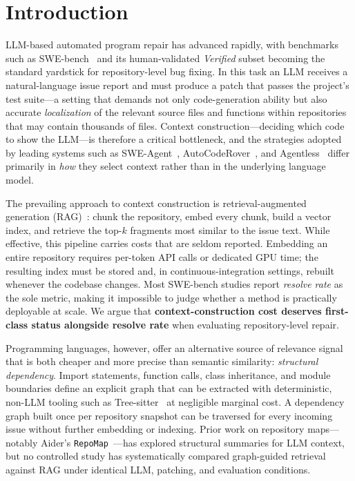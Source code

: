 \section{Introduction}\label{sec:introduction}

LLM-based automated program repair has advanced rapidly, with benchmarks such as SWE-bench~\cite{swebench2024} and its human-validated \emph{Verified} subset becoming the standard yardstick for repository-level bug fixing. In this task an LLM receives a natural-language issue report and must produce a patch that passes the project's test suite---a setting that demands not only code-generation ability but also accurate \emph{localization} of the relevant source files and functions within repositories that may contain thousands of files. Context construction---deciding which code to show the LLM---is therefore a critical bottleneck, and the strategies adopted by leading systems such as SWE-Agent~\cite{yang2024sweagent}, AutoCodeRover~\cite{zhang2024autocoderover}, and Agentless~\cite{xia2024agentless} differ primarily in \emph{how} they select context rather than in the underlying language model.

The prevailing approach to context construction is retrieval-augmented generation (RAG)~\cite{lewis2020rag}: chunk the repository, embed every chunk, build a vector index, and retrieve the top-$k$ fragments most similar to the issue text. While effective, this pipeline carries costs that are seldom reported. Embedding an entire repository requires per-token API calls or dedicated GPU time; the resulting index must be stored and, in continuous-integration settings, rebuilt whenever the codebase changes. Most SWE-bench studies report \emph{resolve rate} as the sole metric, making it impossible to judge whether a method is practically deployable at scale. We argue that \textbf{context-construction cost deserves first-class status alongside resolve rate} when evaluating repository-level repair.

Programming languages, however, offer an alternative source of relevance signal that is both cheaper and more precise than semantic similarity: \emph{structural dependency}. Import statements, function calls, class inheritance, and module boundaries define an explicit graph that can be extracted with deterministic, non-LLM tooling such as Tree-sitter~\cite{brunsfeld2018treesitter} at negligible marginal cost. A dependency graph built once per repository snapshot can be traversed for every incoming issue without further embedding or indexing. Prior work on repository maps---notably Aider's \texttt{RepoMap}~\cite{aider2023}---has explored structural summaries for LLM context, but no controlled study has systematically compared graph-guided retrieval against RAG under identical LLM, patching, and evaluation conditions.

